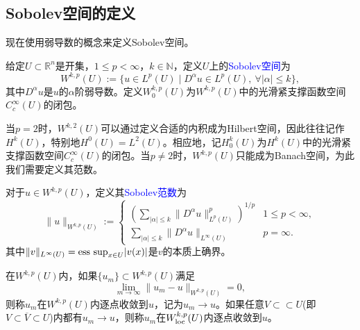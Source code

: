 \documentclass[a4paper,10pt]{ctexart}
\begin{document}
\subsection{Sobolev空间的定义}
现在使用弱导数的概念来定义Sobolev空间。
\begin{definition}
    给定$ U\subset \mathbb{R}^n $是开集，$ 1\leqslant p < \infty $，$ k\in \mathbb{N} $，定义$ U $上的\textcolor{blue}{Sobolev空间}为
    \begin{equation}
        W^{k,p}(U) := \{ u\in L^p(U) \mid D^\alpha u\in L^p(U),\ \forall |\alpha|\leqslant k \},
    \end{equation}
    其中$ D^\alpha u $是$ u $的$ \alpha $阶弱导数。定义$ W^{k,p}_0(U) $为$ W^{k,p}(U) $中的光滑紧支撑函数空间$ C^\infty_c(U) $的闭包。
\end{definition}
\noindent 当$ p=2 $时，$ W^{k,2}(U) $可以通过定义合适的内积成为Hilbert空间，因此往往记作$ H^k(U) $，特别地$ H^0(U) = L^2(U) $。相应地，记$ H^k_{0}(U) $为$ H^k(U) $中的光滑紧支撑函数空间$ C^\infty_c(U) $的闭包。当$ p\ne 2 $时，$ W^{k,p}(U) $只能成为Banach空间，为此我们需要定义其范数。
\begin{definition}
    对于$ u\in W^{k,p}(U) $，定义其\textcolor{blue}{Sobolev范数}为
    \begin{equation}
        \| u \|_{W^{k,p}(U)} := 
        \begin{cases}
            \left( \sum_{|\alpha|\leqslant k} \| D^\alpha u \|_{L^p(U)}^p \right)^{1/p} & 1\leqslant p<\infty,\\
            \sum_{|\alpha|\leqslant k} \| D^\alpha u \|_{L^\infty(U)} & p=\infty.
        \end{cases}
    \end{equation}
    其中$ \| v \|_{L^\infty(U)} = {\rm ess\ sup}_{x\in U} |v(x)| $是$ v $的本质上确界。
\end{definition}
\noindent 在$ W^{k,p}(U) $内，如果$ \{u_m\}\subset W^{k,p}(U) $满足
\begin{equation}
    \lim_{m\to\infty} \| u_m - u \|_{W^{k,p}(U)} = 0,
\end{equation}
则称$ u_m $在$ W^{k,p}(U) $内逐点收敛到$ u $，记为$ u_m\to u $。如果任意$ V\subset\subset U $(即$ V\subset \overline{V}\subset U $)内都有$ u_m\to u $，则称$ u_m $在$ W^{k,p}_{\rm loc}(U) $内逐点收敛到$ u $。
\end{document}
